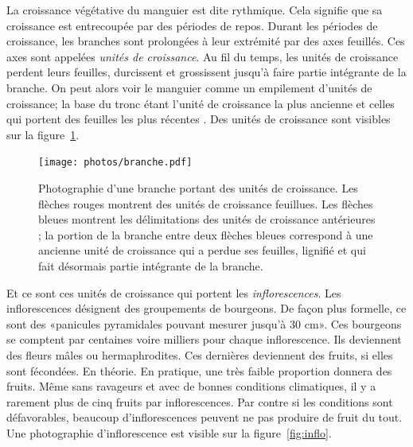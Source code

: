 La croissance végétative du manguier est dite rythmique.
Cela signifie que sa croissance est entrecoupée par des périodes de repos.
Durant les périodes de croissance, les branches sont prolongées à leur extrémité par des axes feuillés.
Ces axes sont appelées \emph{unités de croissance}. 
Au fil du temps, les unités de croissance perdent leurs feuilles, durcissent et grossissent jusqu'à faire partie intégrante de la branche.
On peut alors voir le manguier comme un empilement d'unités de croissance;
la base du tronc étant l'unité de croissance la plus ancienne et celles qui portent des feuilles les plus récentes \citep{normand2009}.
Des unités de croissance sont visibles sur la figure~\ref{fig:uc}.
\begin{figure}[ht]
 \centering
 \texttt{[image: photos/branche.pdf]}
 \caption{Photographie d'une branche portant des unités de croissance. Les flèches rouges montrent des unités de croissance feuillues. Les flèches bleues montrent les délimitations des unités de croissance antérieures ; la portion de la branche entre deux flèches bleues correspond à une ancienne unité de croissance qui a perdue ses feuilles, lignifié et qui fait désormais partie intégrante de la branche.}
 \label{fig:uc}
\end{figure}


\newpage

Et ce sont ces unités de croissance qui portent les \emph{inflorescences}.
Les inflorescences désignent des groupements de bourgeons. De façon plus formelle, ce sont des «panicules pyramidales pouvant mesurer jusqu’à 30 cm».
Ces bourgeons se comptent par centaines voire milliers pour chaque inflorescence. 
Ils deviennent des fleurs mâles ou hermaphrodites.
Ces dernières deviennent des fruits, si elles sont fécondées.
En théorie.
En pratique, une très faible proportion donnera des fruits.
Même sans ravageurs et avec de bonnes conditions climatiques, il y a rarement plus de cinq fruits par inflorescences.
Par contre si les conditions sont défavorables, beaucoup d'inflorescences peuvent ne pas produire de fruit du tout.
Une photographie d'inflorescence est visible sur la figure~\ref{fig:inflo}.

